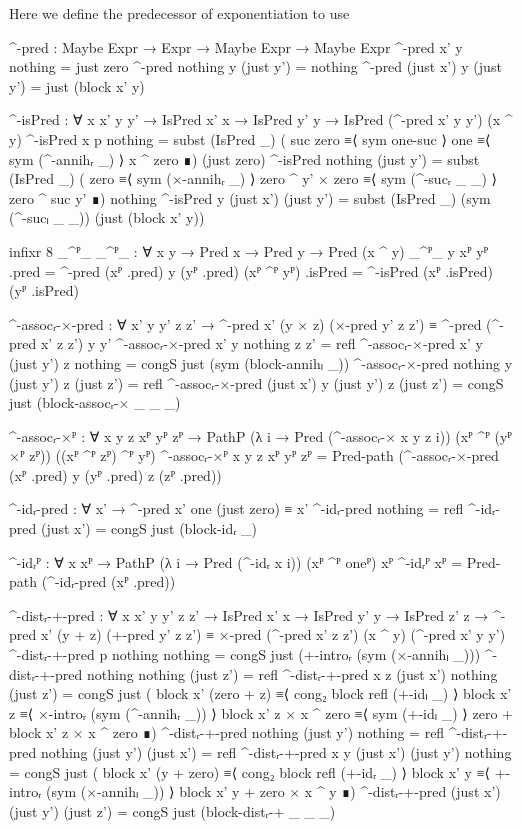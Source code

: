 Here we define the predecessor of exponentiation to use 
\begin{code}
  ^-pred :
    Maybe Expr → Expr → Maybe Expr → Maybe Expr
  ^-pred x'         y nothing    = just zero
  ^-pred nothing    y (just y')  = nothing
  ^-pred (just x')  y (just y')  = just (block x' y)
\end{code}
\begin{code}[hide]
  ^-isPred :
    ∀ {x x' y y'} →
    IsPred x' x → IsPred y' y → IsPred (^-pred x' y y') (x ^ y)
  ^-isPred {x} p nothing =
    subst (IsPred _)
      ( suc zero ≡⟨ sym one-suc ⟩
        one      ≡⟨ sym (^-annihᵣ _) ⟩
        x ^ zero ∎)
      (just zero)
  ^-isPred nothing (just y') =
    subst (IsPred _)
      ( zero              ≡⟨ sym (×-annihᵣ _) ⟩
        zero ^ y' × zero ≡⟨ sym (^-sucᵣ _ _) ⟩
        zero ^ suc y'    ∎)
      nothing
  ^-isPred {y} (just x') (just y') =
    subst (IsPred _) (sym (^-sucₗ _ _)) (just (block x' y))

  infixr 8 _^ᴾ_
  _^ᴾ_ : ∀ {x y} → Pred x → Pred y → Pred (x ^ y)
  _^ᴾ_ {y} xᴾ yᴾ .pred = ^-pred (xᴾ .pred) y (yᴾ .pred)
  (xᴾ ^ᴾ yᴾ) .isPred = ^-isPred (xᴾ .isPred) (yᴾ .isPred)

  ^-assocᵣ-×-pred :
    ∀ x' y y' z z' →
    ^-pred x' (y × z) (×-pred y' z z') ≡ ^-pred (^-pred x' z z') y y'
  ^-assocᵣ-×-pred x' y nothing z z' = refl
  ^-assocᵣ-×-pred x' y (just y') z nothing = congS just (sym (block-annihₗ _))
  ^-assocᵣ-×-pred nothing y (just y') z (just z') = refl
  ^-assocᵣ-×-pred (just x') y (just y') z (just z') =
    congS just (block-assocᵣ-× _ _ _)

  ^-assocᵣ-×ᴾ :
    ∀ {x y z} xᴾ yᴾ zᴾ →
    PathP (λ i → Pred (^-assocᵣ-× x y z i))
      (xᴾ ^ᴾ (yᴾ ×ᴾ zᴾ)) ((xᴾ ^ᴾ zᴾ) ^ᴾ yᴾ)
  ^-assocᵣ-×ᴾ {x} {y} {z} xᴾ yᴾ zᴾ =
    Pred-path (^-assocᵣ-×-pred (xᴾ .pred) y (yᴾ .pred) z (zᴾ .pred))

  ^-idᵣ-pred : ∀ x' → ^-pred x' one (just zero) ≡ x'
  ^-idᵣ-pred nothing = refl
  ^-idᵣ-pred (just x') = congS just (block-idᵣ _)

  ^-idᵣᴾ : ∀ {x} xᴾ → PathP (λ i → Pred (^-idᵣ x i)) (xᴾ ^ᴾ oneᴾ) xᴾ
  ^-idᵣᴾ xᴾ = Pred-path (^-idᵣ-pred (xᴾ .pred))

  ^-distᵣ-+-pred :
    ∀ {x x' y y' z z'} → IsPred x' x → IsPred y' y → IsPred z' z →
    ^-pred x' (y + z) (+-pred y' z z') ≡
    ×-pred (^-pred x' z z') (x ^ y) (^-pred x' y y')
  ^-distᵣ-+-pred p nothing nothing =
    congS just (+-introᵣ (sym (×-annihₗ _)))
  ^-distᵣ-+-pred nothing nothing (just z') = refl
  ^-distᵣ-+-pred {x} {z} (just x') nothing (just z') =
    congS just
      ( block x' (zero + z)          ≡⟨ cong₂ block refl (+-idₗ _) ⟩
        block x' z                   ≡⟨ ×-introᵣ (sym (^-annihᵣ _)) ⟩
        block x' z × x ^ zero        ≡⟨ sym (+-idₗ _) ⟩
        zero + block x' z × x ^ zero ∎)
  ^-distᵣ-+-pred nothing (just y') nothing = refl
  ^-distᵣ-+-pred nothing (just y') (just x') = refl
  ^-distᵣ-+-pred {x} {y} (just x') (just y') nothing =
    congS just
      ( block x' (y + zero)       ≡⟨ cong₂ block refl (+-idᵣ _) ⟩
        block x' y                ≡⟨ +-introᵣ (sym (×-annihₗ _)) ⟩
        block x' y + zero × x ^ y ∎)
  ^-distᵣ-+-pred (just x') (just y') (just z') =
    congS just (block-distᵣ-+ _ _ _)


\end{code}
